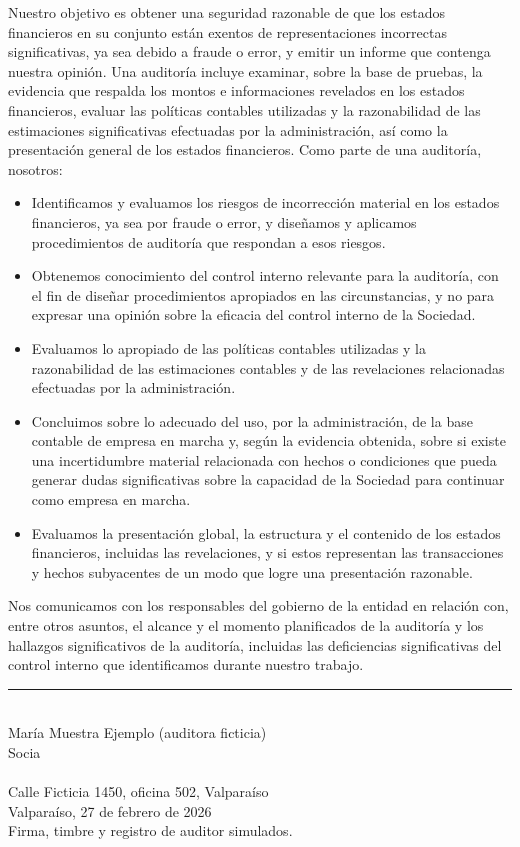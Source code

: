 \documentclass[11pt]{article}
\begin{document}
\noindent Nuestro objetivo es obtener una seguridad razonable de que los estados financieros en su conjunto están exentos de representaciones incorrectas significativas, ya sea debido a fraude o error, y emitir un informe que contenga nuestra opinión. Una auditoría incluye examinar, sobre la base de pruebas, la evidencia que respalda los montos e informaciones revelados en los estados financieros, evaluar las políticas contables utilizadas y la razonabilidad de las estimaciones significativas efectuadas por la administración, así como la presentación general de los estados financieros. Como parte de una auditoría, nosotros:
\begin{itemize}\setlength{\itemsep}{0pt}\setlength{\topsep}{2pt}
  \item Identificamos y evaluamos los riesgos de incorrección material en los estados financieros, ya sea por fraude o error, y diseñamos y aplicamos procedimientos de auditoría que respondan a esos riesgos.
  \item Obtenemos conocimiento del control interno relevante para la auditoría, con el fin de diseñar procedimientos apropiados en las circunstancias, y no para expresar una opinión sobre la eficacia del control interno de la Sociedad.
  \item Evaluamos lo apropiado de las políticas contables utilizadas y la razonabilidad de las estimaciones contables y de las revelaciones relacionadas efectuadas por la administración.
  \item Concluimos sobre lo adecuado del uso, por la administración, de la base contable de empresa en marcha y, según la evidencia obtenida, sobre si existe una incertidumbre material relacionada con hechos o condiciones que pueda generar dudas significativas sobre la capacidad de la Sociedad para continuar como empresa en marcha.
  \item Evaluamos la presentación global, la estructura y el contenido de los estados financieros, incluidas las revelaciones, y si estos representan las transacciones y hechos subyacentes de un modo que logre una presentación razonable.
\end{itemize}
Nos comunicamos con los responsables del gobierno de la entidad en relación con, entre otros asuntos, el alcance y el momento planificados de la auditoría y los hallazgos significativos de la auditoría, incluidas las deficiencias significativas del control interno que identificamos durante nuestro trabajo.

\vspace{22pt}
\noindent\rule{6.4cm}{0.5pt}\\
María Muestra Ejemplo (auditora ficticia)\\
Socia\\
\SIMauditora\\
Calle Ficticia 1450, oficina 502, Valparaíso\\
Valparaíso, 27 de febrero de 2026\\[4pt]
{\small Firma, timbre y registro de auditor simulados.}
\clearpage
\end{document}
